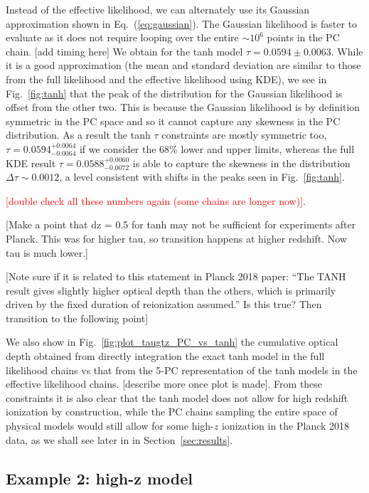 \documentclass[prd,twocolumn,amsmath,amssymb,floatfix,superscriptaddress,nofootinbib]{revtex4-1}
\newcommand{\ch}[1]{\textcolor{red}{#1}}
\begin{document}
Instead of the effective likelihood, we can alternately use its Gaussian approximation shown in Eq.~(\ref{eq:gaussian}). The Gaussian likelihood is faster to evaluate as it does not require looping over the entire $\sim 10^6$ points in the PC chain. [add timing here]
We obtain for the tanh model $\tau = 0.0594 \pm 0.0063$. While it is a good approximation (the mean and standard deviation are similar to those from the full likelihood and the effective likelihood using KDE), we see in Fig.~\ref{fig:tanh} that the peak of the distribution for the Gaussian likelihood is offset from the other two. This is because the Gaussian likelihood is by definition symmetric in the PC space and so it cannot capture any skewness in the PC distribution. As a result the tanh $\tau$ constraints are mostly symmetric too, $\tau = 0.0594_{-0.0064}^{+0.0064}$ if we consider the 68\% lower and upper limits, whereas the full KDE result $\tau = 0.0588_{-0.0072}^{+0.0060}$ is able to capture the skewness in the distribution $\Delta \tau \sim 0.0012$, a level consistent with shifts in the peaks seen in Fig.~\ref{fig:tanh}.

\ch{[double check all these numbers again (some chains are longer now)]}.

[Make a point that dz = 0.5 for tanh may not be sufficient for experiments after Planck. This was for higher tau, so transition happens at higher redshift. Now tau is much lower.] 

[Note sure if it is related to this statement in Planck 2018 paper: ``The TANH result gives slightly higher optical  depth  than  the  others,  which  is  primarily driven  by  the  fixed  duration  of  reionization assumed.” Is this true? Then transition to the following point]


We also show in Fig.~\ref{fig:plot_taugtz_PC_vs_tanh} the cumulative optical depth obtained from directly integration the exact tanh model in the full likelihood chains vs that from the 5-PC representation of the tanh models in the effective likelihood chains. [describe more once plot is made]. From these constraints it is also clear that the tanh model does not allow for high redshift ionization by construction, while the PC chains sampling the entire space of physical models would still allow for some high-$z$ ionization in the Planck 2018 data, as we shall see later in in Section~\ref{sec:results}.

\subsection{Example 2: high-z model}
\label{sec:example2}
\end{document}
